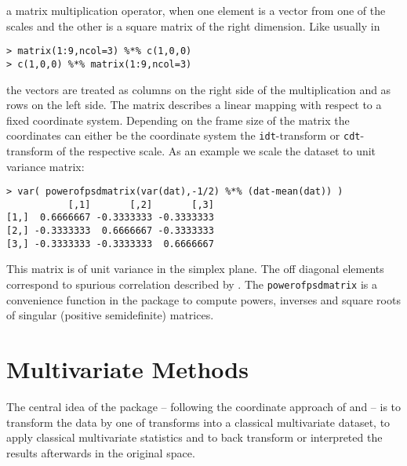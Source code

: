 \documentclass{article}
\newcommand{\code}[1]{{\tt #1}}
\begin{document}
a matrix multiplication operator, when one element is a vector from one of the
scales and the other is a square matrix of the right dimension. Like usually
in
\begin{verbatim}
> matrix(1:9,ncol=3) %*% c(1,0,0)
> c(1,0,0) %*% matrix(1:9,ncol=3) 
\end{verbatim}
the vectors are treated as columns on the right side of the multiplication and
as rows on the left side. The matrix describes a linear mapping with respect
to a fixed coordinate system. Depending on the frame size of the matrix the
coordinates can either be the coordinate system the \code{idt}-transform or
\code{cdt}-transform of the respective scale. As an example we scale the
dataset to unit variance matrix:
\begin{verbatim}
> var( powerofpsdmatrix(var(dat),-1/2) %*% (dat-mean(dat)) )
           [,1]       [,2]       [,3]
[1,]  0.6666667 -0.3333333 -0.3333333
[2,] -0.3333333  0.6666667 -0.3333333
[3,] -0.3333333 -0.3333333  0.6666667
\end{verbatim}
This matrix is of unit variance in the simplex plane. The off diagonal
elements correspond to spurious correlation described by \cite{Cha60}. The
\code{powerofpsdmatrix} is a convenience function in the package to compute
powers, inverses and square roots of singular (positive semidefinite) matrices.



\section{Multivariate Methods}
The central idea of the package -- following the coordinate approach of
\cite{Paw03} and \cite{PM05} -- is to transform the data by one of transforms
into a classical multivariate dataset, to apply classical multivariate
statistics and to back transform or interpreted the results afterwards in the
original space.
\end{document}
